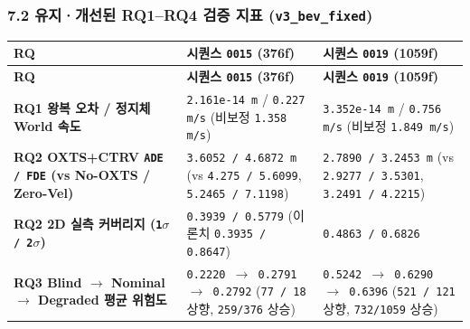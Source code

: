 \documentclass[10.5pt,a4paper]{article}
\begin{document}
\subsubsection{7.2 유지·개선된 RQ1--RQ4 검증 지표 (\texttt{v3\_\allowbreak{}bev\_\allowbreak{}fixed})}

\begin{footnotesize}
\setlength{\tabcolsep}{4pt}
\setlength{\LTleft}{0pt}\setlength{\LTright}{0pt}
\begin{longtable}{>{\raggedright\arraybackslash}p{} >{\raggedright\arraybackslash}p{} >{\raggedright\arraybackslash}p{}}
\toprule
\textbf{RQ} & \textbf{시퀀스 \texttt{0015} (376f)} & \textbf{시퀀스 \texttt{0019} (1059f)} \\
\midrule
\endfirsthead
\toprule
\textbf{RQ} & \textbf{시퀀스 \texttt{0015} (376f)} & \textbf{시퀀스 \texttt{0019} (1059f)} \\
\midrule
\endhead
\bottomrule
\endfoot
\textbf{RQ1 왕복 오차 / 정지체 World 속도} & \texttt{2.\allowbreak{}161e-\allowbreak{}14 m} / \texttt{0.\allowbreak{}227 m/\allowbreak{}s} (비보정 \texttt{1.\allowbreak{}358 m/\allowbreak{}s}) & \texttt{3.\allowbreak{}352e-\allowbreak{}14 m} / \texttt{0.\allowbreak{}756 m/\allowbreak{}s} (비보정 \texttt{1.\allowbreak{}849 m/\allowbreak{}s}) \\
\textbf{RQ2 OXTS+CTRV \texttt{ADE /\allowbreak{} FDE} (vs No-OXTS / Zero-Vel)} & \texttt{3.\allowbreak{}6052 /\allowbreak{} 4.\allowbreak{}6872 m} (vs \texttt{4.\allowbreak{}275 /\allowbreak{} 5.\allowbreak{}6099}, \texttt{5.\allowbreak{}2465 /\allowbreak{} 7.\allowbreak{}1198}) & \texttt{2.\allowbreak{}7890 /\allowbreak{} 3.\allowbreak{}2453 m} (vs \texttt{2.\allowbreak{}9277 /\allowbreak{} 3.\allowbreak{}5301}, \texttt{3.\allowbreak{}2491 /\allowbreak{} 4.\allowbreak{}2215}) \\
\textbf{RQ2 2D 실측 커버리지 (\texttt{1$\sigma$ /\allowbreak{} 2$\sigma$})} & \texttt{0.\allowbreak{}3939 /\allowbreak{} 0.\allowbreak{}5779} (이론치 \texttt{0.\allowbreak{}3935 /\allowbreak{} 0.\allowbreak{}8647}) & \texttt{0.\allowbreak{}4863 /\allowbreak{} 0.\allowbreak{}6826} \\
\textbf{RQ3 Blind $\rightarrow$ Nominal $\rightarrow$ Degraded 평균 위험도} & \texttt{0.\allowbreak{}2220 $\rightarrow$ 0.\allowbreak{}2791 $\rightarrow$ 0.\allowbreak{}2792} (\texttt{77 /\allowbreak{} 18} 상향, \texttt{259/\allowbreak{}376} 상승) & \texttt{0.\allowbreak{}5242 $\rightarrow$ 0.\allowbreak{}6290 $\rightarrow$ 0.\allowbreak{}6396} (\texttt{521 /\allowbreak{} 121} 상향, \texttt{732/\allowbreak{}1059} 상승) \\

\end{longtable}
\end{footnotesize}
\end{document}
